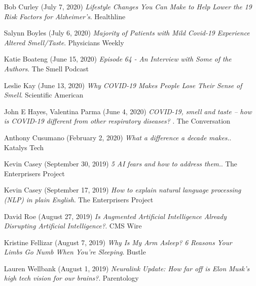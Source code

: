 \documentclass[10pt]{cooperCV2}
\begin{document}
 
\begin{etaremune}[itemindent=-\bibhang, topsep=0pt,
				   itemsep=\bibsep,partopsep=0pt,parsep=0pt,leftmargin={\bibhang+\widthof{[999]}}] 
    
    
    \item Bob Curley (July 7, 2020) \textit{Lifestyle Changes You Can Make to Help Lower the 19 Risk Factors for Alzheimer’s}. Healthline
     
	
    \item Salynn Boyles (July 6, 2020) \textit{Majority of Patients with Mild Covid-19 Experience Altered Smell/Taste}. Physicians Weekly
     
	
    \item Katie Boateng (June 15, 2020) \textit{Episode 64 - An Interview with Some of the Authors}. The Smell Podcast
     
	
    \item Leslie Kay (June 13, 2020) \textit{Why COVID-19 Makes People Lose Their Sense of Smell}. Scientific American
     
	
    \item John E Hayes, Valentina Parma (June 4, 2020) \textit{COVID-19, smell and taste – how is COVID-19 different from other respiratory diseases? }. The Conversation
     
	
    \item Anthony Cusumano (February 2, 2020) \textit{What a difference a decade makes.}. Katalys Tech
     
	
    \item Kevin Casey (September 30, 2019) \textit{5 AI fears and how to address them.}. The Enterprisers Project
     
	
    \item Kevin Casey (September 17, 2019) \textit{How to explain natural language processing (NLP) in plain English}. The Enterprisers Project
     
	
    \item David Roe (August 27, 2019) \textit{Is Augmented Artificial Intelligence Already Disrupting Artificial Intelligence?}. CMS Wire
     
	
    \item Kristine Fellizar (August 7, 2019) \textit{Why Is My Arm Asleep? 6 Reasons Your Limbs Go Numb When You're Sleeping}. Bustle
     
	
    \item Lauren Wellbank (August 1, 2019) \textit{Neuralink Update: How far off is Elon Musk’s high tech vision for our brains?}. Parentology
     

\end{etaremune}
\end{document}
